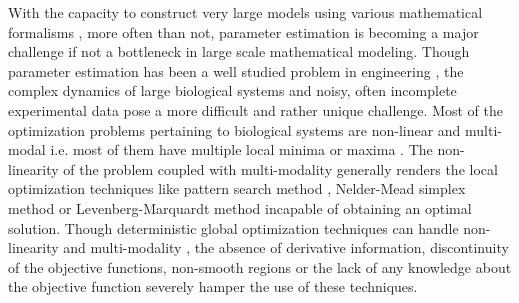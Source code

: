 \documentclass[12pt]{article}
\begin{document}
With the capacity to construct very large models using various mathematical formalisms \cite{chen2009input} \cite{tasseff2011modeling}\cite{luan2007computationally} \cite{mo2007genome} \cite{orth2011comprehensive} \cite{karr2012whole}\cite{buchel2013path2models} \cite{smallbone2010towards}, more often than not, parameter estimation is becoming a major challenge if not a bottleneck in large scale mathematical modeling. Though parameter estimation has been a well studied problem in engineering \cite{beck1977parameter}\cite{nieman1971review}\cite{young1981parameter} \cite {beck1998inverse}, the complex dynamics of large biological systems and noisy, often incomplete experimental data pose a more difficult and rather unique challenge. Most of the optimization problems pertaining to biological systems are non-linear and multi-modal i.e. most of them have multiple local minima or maxima \cite{moles2003parameter}\cite{banga2008optimization}. The non-linearity of the problem coupled with multi-modality generally renders the local optimization techniques like pattern search method \cite{hooke1961direct}, Nelder-Mead simplex method \cite{nelder1965simplex} or Levenberg-Marquardt method\cite{more1978levenberg} incapable of obtaining an optimal solution. Though deterministic global optimization techniques can handle non-linearity and multi-modality \cite{esposito2000deterministic} \cite{horst2013global}, the absence of derivative information, discontinuity of the objective functions, non-smooth regions or the lack of any knowledge about the objective function severely hamper the use of these techniques. 
\end{document}
